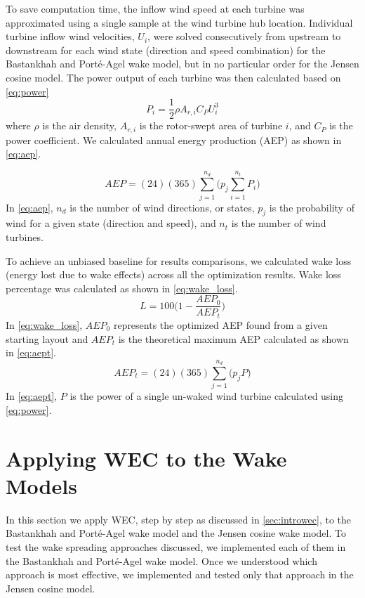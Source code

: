 \documentclass{jpconf}
\begin{document}
To save computation time, the inflow wind speed at each turbine was approximated using a single sample at the wind turbine hub location. Individual turbine inflow wind velocities, $U_i$, were solved consecutively from upstream to downstream for each wind state (direction and speed combination) for the Bastankhah and Port\'e-Agel wake model, but in no particular order for the Jensen cosine model. The power output of each turbine was then calculated based on \cref{eq:power}
%
\begin{equation}\label{eq:power}
P_i = \frac{1}{2}\rho A_{r,i}C_P U_i^3
\end{equation}
%
where $\rho$ is the air density, $A_{r,i}$ is the rotor-swept area of turbine $i$, and $C_P$ is the power coefficient. We calculated annual energy production (AEP) as shown in \cref{eq:aep}.

\begin{equation} \label{eq:aep}
AEP = (24)(365)\sum_{j=1}^{n_d} \bigg( p_j \sum_{i=1}^{n_t} P_i \bigg)  
\end{equation}
%
 In \cref{eq:aep}, $n_d$ is the number of wind directions, or states, $p_j$ is the probability of wind for a given state (direction and speed), and $n_t$ is the number of wind turbines.

To achieve an unbiased baseline for results comparisons, we calculated wake loss (energy lost due to wake effects) across all the optimization results. Wake loss percentage was calculated as shown in \cref{eq:wake_loss}.
%
\begin{equation} \label{eq:wake_loss}
	L = 100 \bigg( 1 - \frac{AEP_0}{AEP_t} \bigg)
\end{equation}
%
In \cref{eq:wake_loss}, $AEP_0$ represents the optimized AEP found from a given starting layout and $AEP_t$ is the theoretical maximum AEP calculated as shown in \cref{eq:aept}. 
%
\begin{equation} \label{eq:aept}
	AEP_t = (24)(365)\sum_{j=1}^{n_d} \bigg( p_j P \bigg)  
\end{equation}
%
In \cref{eq:aept}, $P$ is the power of a single un-waked wind turbine calculated using \cref{eq:power}. 

\section{Applying WEC to the  Wake Models}
In this section we apply WEC, step by step as discussed in \cref{sec:introwec}, to the Bastankhah and Port\'e-Agel wake model and the Jensen cosine wake model. To test the wake spreading approaches discussed, we implemented each of them in the Bastankhah and Port\'{e}-Agel wake model. Once we understood which approach is most effective, we implemented and tested only that approach in the Jensen cosine model.
\end{document}
